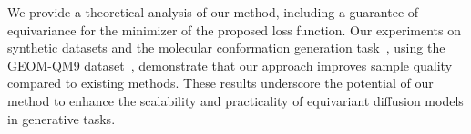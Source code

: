 We provide a theoretical analysis of our method, including a guarantee of equivariance for the minimizer of the proposed loss function. Our experiments on synthetic datasets and the molecular conformation generation task~, using the GEOM-QM9 dataset~, demonstrate that our approach improves sample quality compared to existing methods. These results underscore the potential of our method to enhance the scalability and practicality of equivariant diffusion models in generative tasks.








